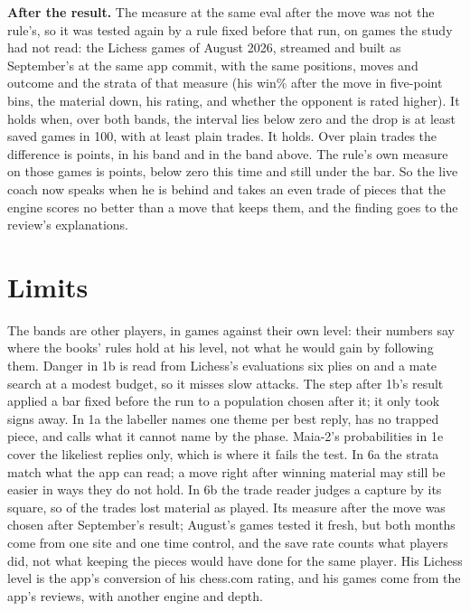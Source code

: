 \documentclass[11pt]{article}
\begin{document}
\textbf{After the result.} The measure at the same eval after the move was not the rule's, so it was
tested again by a rule fixed before that run, on games the study had not read: the Lichess games of
August 2026, streamed and built as September's at the same app commit, with the same positions,
moves and outcome and the strata of that measure (his win\% after the move in five-point bins, the
material down, his rating, and whether the opponent is rated higher). It holds when, over both
bands, the interval lies below zero and the drop is at least \LostTradesDropBar{} saved games in
100, with at least \LostTradesMinTrades{} plain trades. It holds. Over \LostTradesAugPlain{} plain
trades the difference is \LostTradesAugAfterDiff{} points, \LostTradesAugHisAfter{} in his band and
\LostTradesAugAboveAfter{} in the band above. The rule's own measure on those games is
\LostTradesAugBeforeDiff{} points, below zero this time and still under the bar. So the live coach
now speaks when he is behind and takes an even trade of pieces that the engine scores no better than
a move that keeps them, and the finding goes to the review's explanations.

\begin{table}[h]
\centering
\scriptsize\LostTradesTable
\caption{At the first position where a player two pawns or more down and losing could trade pieces
evenly: how often he traded, how often the game was saved, and the difference in positions alike by
the eval before the move (the rule) and after it, in September's games and in August's, which
rechecked the measure after the move.}
\label{tab:losttrades}
\end{table}

\section{Limits}

The bands are other players, in games against their own level: their numbers say where the books'
rules hold at his level, not what he would gain by following them. Danger in 1b is read from Lichess's
evaluations six plies on and a mate search at a modest budget, so it misses slow attacks. The step
after 1b's result applied a bar fixed before the run to a population chosen after it; it only took
signs away. In 1a the labeller names one theme per best reply, has no trapped piece, and calls what
it cannot name by the phase. Maia-2's probabilities in 1e cover the likeliest
replies only, which is where it fails the test. In 6a the strata match what the app can read; a move
right after winning material may still be easier in ways they do not hold. In 6b the trade reader
judges a capture by its square, so \LostTradesMoveLoses{} of the \LostTradesAll{} trades lost
material as played. Its measure after the move was chosen after September's result; August's games
tested it fresh, but both months come from one site and one time control, and the save rate counts
what players did, not what keeping the pieces would have done for the same player. His Lichess level is the app's conversion of his chess.com rating,
and his games come from the app's reviews, with another engine and depth.
\end{document}
